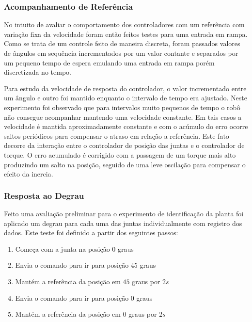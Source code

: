 \subsubsection{Acompanhamento de Referência}

No intuito de avaliar o comportamento dos controladores com um referência  com variação fixa da velocidade foram então feitos testes para uma entrada em rampa. Como se trata de um controle feito de maneira discreta, foram passados valores de ângulos em sequência incrementados por um valor contante e separados por um pequeno tempo de espera emulando uma entrada em rampa porém discretizada no tempo.

Para estudo da velocidade de resposta do controlador, o valor incrementado entre um ângulo e outro foi mantido enquanto o intervalo de tempo era ajustado. Neste experimento foi observado que para intervalos muito pequenos de tempo o robô não consegue acompanhar mantendo uma velocidade constante. Em tais casos a velocidade é mantida aproximadamente constante e com o acúmulo do erro ocorre saltos periódicos para compensar o atraso em relação a referência. Este fato decorre da interação entre o controlador de posição das juntas e o controlador de torque. O erro acumulado é corrigido com a passagem de um torque mais alto produzindo um salto na posição, seguido de uma leve oscilação para compensar o efeito da inercia.


\subsubsection{Resposta ao Degrau}

Feito uma avaliação preliminar para o experimento de identificação da planta foi aplicado um degrau para cada uma das juntas individualmente com registro dos dados. Este teste foi definido a partir dos seguintes passos:

\begin{enumerate}
    \item Começa com a junta na posição $0$ graus
    \item Envia o comando para ir para posição $45$ graus
    \item Mantém a referência da posição em $45$ graus por $2s$
    \item Envia o comando para ir para posição $0$ graus
    \item Mantém a referência da posição em $0$ graus por $2s$
\end{enumerate}

